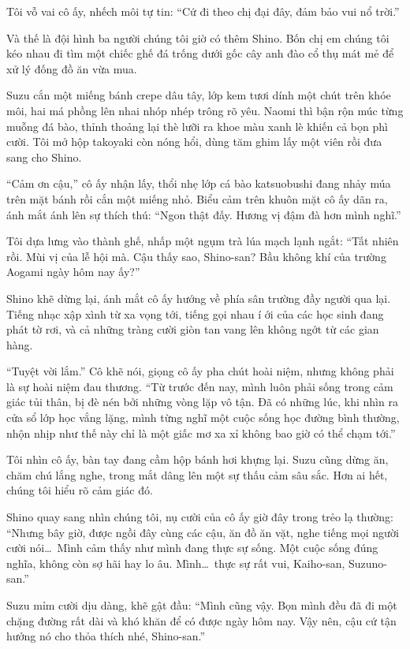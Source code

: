 \documentclass[../main.tex]{subfiles}
\begin{document}
Tôi vỗ vai cô ấy, nhếch môi tự tin: ``Cứ đi theo chị đại đây, đảm bảo vui nổ trời.''

Và thế là đội hình ba người chúng tôi giờ có thêm Shino. Bốn chị em chúng tôi kéo nhau đi tìm một chiếc ghế đá trống dưới gốc cây anh đào cổ thụ mát mẻ để xử lý đống đồ ăn vừa mua.

Suzu cắn một miếng bánh crepe dâu tây, lớp kem tươi dính một chút trên khóe môi, hai má phồng lên nhai nhóp nhép trông rõ yêu. Naomi thì bận rộn múc từng muỗng đá bào, thỉnh thoảng lại thè lưỡi ra khoe màu xanh lè khiến cả bọn phì cười. Tôi mở hộp takoyaki còn nóng hổi, dùng tăm ghim lấy một viên rồi đưa sang cho Shino.

``Cảm ơn cậu,'' cô ấy nhận lấy, thổi nhẹ lớp cá bào katsuobushi đang nhảy múa trên mặt bánh rồi cắn một miếng nhỏ. Biểu cảm trên khuôn mặt cô ấy dãn ra, ánh mắt ánh lên sự thích thú: ``Ngon thật đấy. Hương vị đậm đà hơn mình nghĩ.''

Tôi dựa lưng vào thành ghế, nhấp một ngụm trà lúa mạch lạnh ngắt: ``Tất nhiên rồi. Mùi vị của lễ hội mà. Cậu thấy sao, Shino-san? Bầu không khí của trường Aogami ngày hôm nay ấy?''

Shino khẽ dừng lại, ánh mắt cô ấy hướng về phía sân trường đầy người qua lại. Tiếng nhạc xập xình từ xa vọng tới, tiếng gọi nhau í ới của các học sinh đang phát tờ rơi, và cả những tràng cười giòn tan vang lên không ngớt từ các gian hàng.

``Tuyệt vời lắm.'' Cô khẽ nói, giọng cô ấy pha chút hoài niệm, nhưng không phải là sự hoài niệm đau thương. ``Từ trước đến nay, mình luôn phải sống trong cảm giác tủi thân, bị đè nén bởi những vòng lặp vô tận. Đã có những lúc, khi nhìn ra cửa sổ lớp học vắng lặng, mình từng nghĩ một cuộc sống học đường bình thường, nhộn nhịp như thế này chỉ là một giấc mơ xa xỉ không bao giờ có thể chạm tới.''

Tôi nhìn cô ấy, bàn tay đang cầm hộp bánh hơi khựng lại. Suzu cũng dừng ăn, chăm chú lắng nghe, trong mắt dâng lên một sự thấu cảm sâu sắc. Hơn ai hết, chúng tôi hiểu rõ cảm giác đó.

Shino quay sang nhìn chúng tôi, nụ cười của cô ấy giờ đây trong trẻo lạ thường: ``Nhưng bây giờ, được ngồi đây cùng các cậu, ăn đồ ăn vặt, nghe tiếng mọi người cười nói\dots\ Mình cảm thấy như mình đang thực sự sống. Một cuộc sống đúng nghĩa, không còn sợ hãi hay lo âu. Mình\dots\ thực sự rất vui, Kaiho-san, Suzuno-san.''

Suzu mỉm cười dịu dàng, khẽ gật đầu: ``Mình cũng vậy. Bọn mình đều đã đi một chặng đường rất dài và khó khăn để có được ngày hôm nay. Vậy nên, cậu cứ tận hưởng nó cho thỏa thích nhé, Shino-san.''
\end{document}
